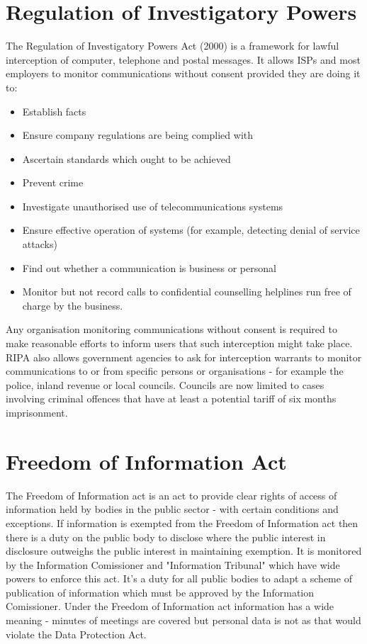\documentclass{article}
\begin{document}
	\section{Regulation of Investigatory Powers}
	The Regulation of Investigatory Powers Act (2000) is a framework for lawful interception of computer, telephone and postal messages. It allows ISPs and most employers to monitor communications without consent provided they are doing it to:
	\begin{itemize}
		\item Establish facts
		\item Ensure company regulations are being complied with
		\item Ascertain standards which ought to be achieved
		\item Prevent crime
		\item Investigate unauthorised use of telecommunications systems
		\item Ensure effective operation of systems (for example, detecting denial of service attacks)
		\item Find out whether a communication is business or personal
		\item Monitor but not record calls to confidential counselling helplines run free of charge by the business.
	\end{itemize}
	
	Any organisation monitoring communications without consent is required to make reasonable efforts to inform users that such interception might take place. RIPA also allows government agencies to ask for interception warrants to monitor communications to or from specific persons or organisations - for example the police, inland revenue or local councils. Councils are now limited to cases involving criminal offences that have at least a potential tariff of six months imprisonment.
		
	
	\section{Freedom of Information Act}
	The Freedom of Information act is an act to provide clear rights of access of information held by bodies in the public sector - with certain conditions and exceptions. If information is exempted from the Freedom of Information act then there is a duty on the public body to disclose where the public interest in disclosure outweighs the public interest in maintaining exemption. It is monitored by the Information Comissioner and "Information Tribunal" which have wide powers to enforce this act. It's a duty for all public bodies to adapt a scheme of publication of information which must be approved by the Information Comissioner. Under the Freedom of Information act information has a wide meaning - minutes of meetings are covered but personal data is not as that would violate the Data Protection Act.
	
\end{document}
